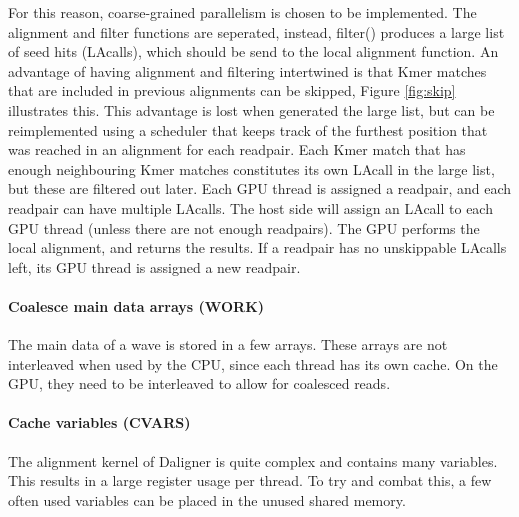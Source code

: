 \documentclass[../main/thesis.tex]{subfiles}
\begin{document}
For this reason, coarse-grained parallelism is chosen to be implemented.
The alignment and filter functions are seperated, instead, filter() produces a large list of seed hits (LAcalls), which should be send to the local alignment function.
An advantage of having alignment and filtering intertwined is that Kmer matches that are included in previous alignments can be skipped, Figure \ref{fig:skip} illustrates this.
This advantage is lost when generated the large list, but can be reimplemented using a scheduler that keeps track of the furthest position that was reached in an alignment for each readpair.
Each Kmer match that has enough neighbouring Kmer matches constitutes its own LAcall in the large list, but these are filtered out later.
Each GPU thread is assigned a readpair, and each readpair can have multiple LAcalls.
The host side will assign an LAcall to each GPU thread (unless there are not enough readpairs).
The GPU performs the local alignment, and returns the results.
If a readpair has no unskippable LAcalls left, its GPU thread is assigned a new readpair.



\paragraph{Coalesce main data arrays (WORK)}
The main data of a wave is stored in a few arrays.
These arrays are not interleaved when used by the CPU, since each thread has its own cache.
On the GPU, they need to be interleaved to allow for coalesced reads.

\paragraph{Cache variables (CVARS)}
The alignment kernel of Daligner is quite complex and contains many variables.
This results in a large register usage per thread.
To try and combat this, a few often used variables can be placed in the unused shared memory.

\end{document}

